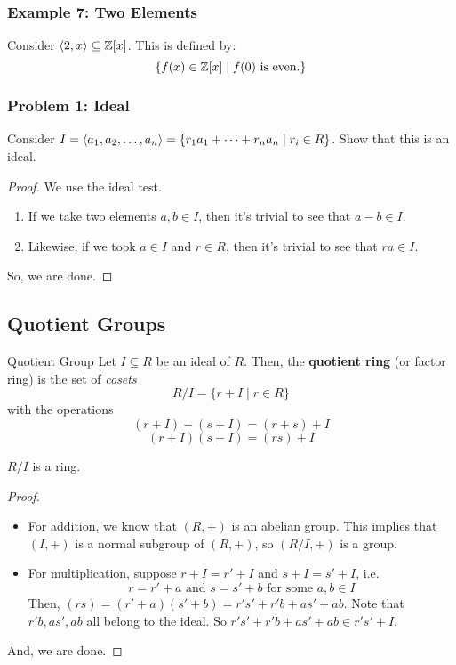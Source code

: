 \documentclass[letterpaper]{article}
\begin{document}
\subsubsection{Example 7: Two Elements}
Consider $\langle 2, x \rangle \subseteq \mathbb{Z}[x]$. This is defined by: 
\[\{f(x) \in \mathbb{Z}[x] \mid f(0) \text{ is even.}\}\]


\subsubsection{Problem 1: Ideal}
Consider $I = \langle a_1, a_2, \dots, a_n \rangle = \{r_1 a_1 + \dots + r_n a_n \mid r_i \in R\}$. Show that this is an ideal. 

\begin{mdframed}[]
    \begin{proof}
        We use the ideal test. 
        \begin{enumerate}
            \item If we take two elements $a, b \in I$, then it's trivial to see that $a - b \in I$.
            \item Likewise, if we took $a \in I$ and $r \in R$, then it's trivial to see that $ra \in I$. 
        \end{enumerate}
        So, we are done. 
    \end{proof}
\end{mdframed}

\subsection{Quotient Groups}
\begin{definition}{Quotient Group}{}
    Let $I \subseteq R$ be an ideal of $R$. Then, the \textbf{quotient ring} (or factor ring) is the set of \emph{cosets}
    \[R / I = \{r + I \mid r \in R\}\]
    with the operations
    \[(r + I) + (s + I) = (r + s) + I\]
    \[(r + I)(s + I) = (rs) + I\]
\end{definition}

\begin{proposition}
    $R / I$ is a ring. 
\end{proposition}

\begin{mdframed}[]
    \begin{proof}
        \begin{itemize}
            \item For addition, we know that $(R, +)$ is an abelian group. This implies that $(I, +)$ is a normal subgroup of $(R, +)$, so $(R / I, +)$ is a group.
            \item For multiplication, suppose $r + I = r' + I$ and $s + I = s' + I$, i.e.
            \[r = r' + a \text{ and } s = s' + b \text{ for some } a, b \in I\]
            Then, $(rs) = (r' + a)(s' + b) = r's' + r'b + as' + ab$. Note that $r'b, as', ab$ all belong to the ideal. So $r's' + r'b + as' + ab \in r's' + I$.
        \end{itemize}
        And, we are done. 
    \end{proof}
\end{mdframed}
\end{document}
